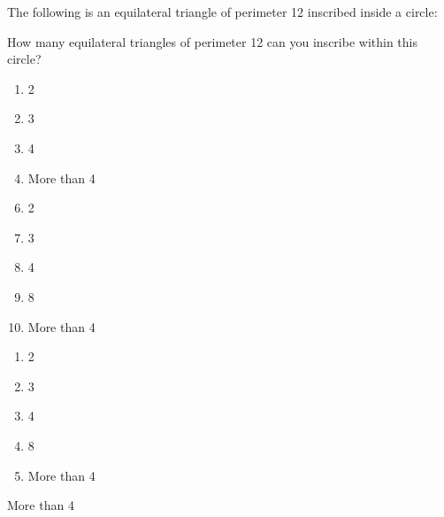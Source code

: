 

  The following is an equilateral triangle of perimeter 12 inscribed inside a circle: \begin{center}
\end{center}
How many equilateral triangles of perimeter 12 can you inscribe within this circle?


\ifsat
	\begin{enumerate}[label=\Alph*)]
		\item    2
		\item  3
		\item 4
		\item More than 4 %
	\end{enumerate}
\else
\fi

\ifacteven
	\begin{enumerate}[label=\textbf{\Alph*.},itemsep=\fill,align=left]
		\setcounter{enumii}{5}
		\item    2
		\item  3
		\item 4
		\addtocounter{enumii}{1}
		\item 8
		\item More than 4 %
	\end{enumerate}
\else
\fi

\ifactodd
	\begin{enumerate}[label=\textbf{\Alph*.},itemsep=\fill,align=left]
		\item    2
		\item  3
		\item 4
		\item 8
		\item More than 4 %
	\end{enumerate}
\else
\fi

\ifgridin
 More than 4 %

\else
\fi

